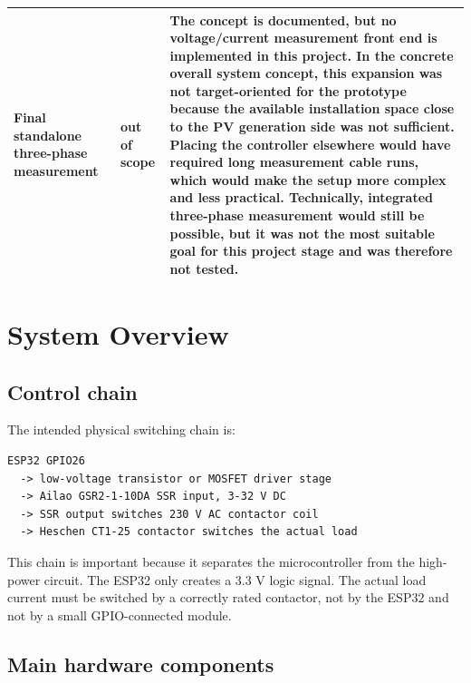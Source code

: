\documentclass[12pt,a4paper]{article}
\newcommand{\statusoutofscope}{out of scope}
\begin{document}
\begin{longtable}{p{}p{}p{}}
Final standalone three-phase measurement & \statusoutofscope &
The concept is documented, but no voltage/current measurement front end is
implemented in this project. In the concrete overall system concept, this
expansion was not
target-oriented for the prototype because the available installation space close
to the PV generation side was not sufficient. Placing the controller elsewhere
would have required long measurement cable runs, which would make the setup more
complex and less practical. Technically, integrated three-phase measurement would
still be possible, but it was not the most suitable goal for this project stage
and was therefore not tested.\\
\bottomrule
\end{longtable}

\newpage
\section{System Overview}

\subsection{Control chain}

The intended physical switching chain is:

\begin{lstlisting}
ESP32 GPIO26
  -> low-voltage transistor or MOSFET driver stage
  -> Ailao GSR2-1-10DA SSR input, 3-32 V DC
  -> SSR output switches 230 V AC contactor coil
  -> Heschen CT1-25 contactor switches the actual load
\end{lstlisting}

This chain is important because it separates the microcontroller from the
high-power circuit. The ESP32 only creates a 3.3 V logic signal. The actual load
current must be switched by a correctly rated contactor, not by the ESP32 and not
by a small GPIO-connected module.

\subsection{Main hardware components}
\end{document}
